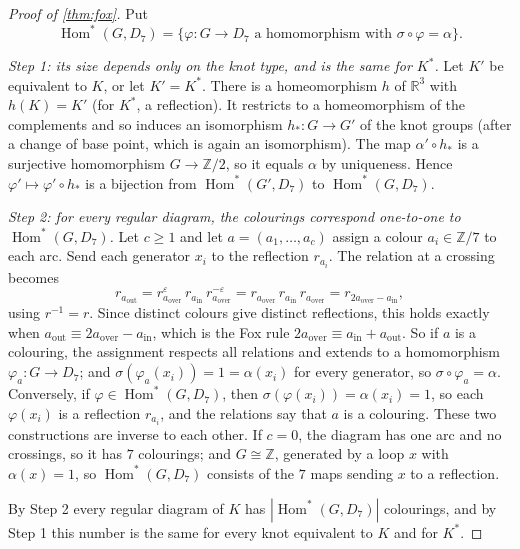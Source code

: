 \documentclass[11pt]{article}
\theoremstyle{plain}
\theoremstyle{definition}
\theoremstyle{remark}
\newcommand{\Z}{\mathbb{Z}}
\newcommand{\R}{\mathbb{R}}
\begin{document}
\begin{proof}[Proof of \cref{thm:fox}]
Put
\[ \operatorname{Hom}^*(G,D_7)=\{\varphi:G\to D_7 \text{ a homomorphism with } \sigma\circ\varphi=\alpha\}. \]

\emph{Step 1: its size depends only on the knot type, and is the same for $K^*$.} Let $K'$ be
equivalent to $K$, or let $K'=K^*$. There is a homeomorphism $h$ of $\R^3$ with $h(K)=K'$ (for $K^*$, a
reflection). It restricts to a homeomorphism of the complements and so induces an isomorphism
$h_*:G\to G'$ of the knot groups (after a change of base point, which is again an isomorphism). The map
$\alpha'\circ h_*$ is a surjective homomorphism $G\to\Z/2$, so it equals $\alpha$ by uniqueness. Hence
$\varphi'\mapsto\varphi'\circ h_*$ is a bijection from $\operatorname{Hom}^*(G',D_7)$ to
$\operatorname{Hom}^*(G,D_7)$.

\emph{Step 2: for every regular diagram, the colourings correspond one-to-one to
$\operatorname{Hom}^*(G,D_7)$.} Let $c\ge1$ and let $a=(a_1,\dots,a_c)$ assign a colour $a_i\in\Z/7$
to each arc. Send each generator $x_i$ to the reflection $r_{a_i}$. The relation at a crossing becomes
\[ r_{a_{\mathrm{out}}}=r_{a_{\mathrm{over}}}^{\varepsilon}\,r_{a_{\mathrm{in}}}\,r_{a_{\mathrm{over}}}^{-\varepsilon}=r_{a_{\mathrm{over}}}\,r_{a_{\mathrm{in}}}\,r_{a_{\mathrm{over}}}=r_{2a_{\mathrm{over}}-a_{\mathrm{in}}}, \]
using $r^{-1}=r$. Since distinct colours give distinct reflections, this holds exactly when
$a_{\mathrm{out}}\equiv2a_{\mathrm{over}}-a_{\mathrm{in}}$, which is the Fox rule
$2a_{\mathrm{over}}\equiv a_{\mathrm{in}}+a_{\mathrm{out}}$. So if $a$ is a colouring, the assignment
respects all relations and extends to a homomorphism $\varphi_a:G\to D_7$; and $\sigma(\varphi_a(x_i))=1=
\alpha(x_i)$ for every generator, so $\sigma\circ\varphi_a=\alpha$. Conversely, if
$\varphi\in\operatorname{Hom}^*(G,D_7)$, then $\sigma(\varphi(x_i))=\alpha(x_i)=1$, so each
$\varphi(x_i)$ is a reflection $r_{a_i}$, and the relations say that $a$ is a colouring. These two
constructions are inverse to each other. If $c=0$, the diagram has one arc and no crossings, so it has
$7$ colourings; and $G\cong\Z$, generated by a loop $x$ with $\alpha(x)=1$, so
$\operatorname{Hom}^*(G,D_7)$ consists of the $7$ maps sending $x$ to a reflection.

By Step 2 every regular diagram of $K$ has $|\operatorname{Hom}^*(G,D_7)|$ colourings, and by Step 1
this number is the same for every knot equivalent to $K$ and for $K^*$.
\end{proof}
\end{document}
